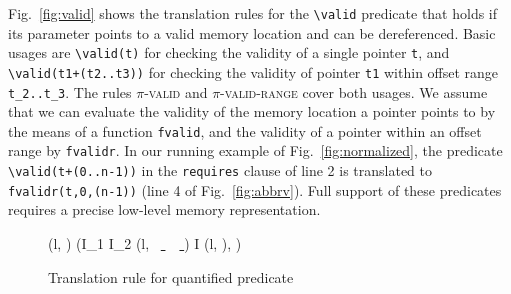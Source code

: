 Fig.~\ref{fig:valid} shows the translation rules for the \lstinline|\valid|
predicate that holds if its parameter points to a valid memory location and can
be dereferenced. 
Basic usages are
\lstinline{\valid(t)} 
for checking  the validity of a single 
pointer \lstinline{t},
and \lstinline|\valid(t1+(t2..t3))| for checking the validity of 
pointer \lstinline{t1} within offset range \lstinline|t_2..t_3|. The rules \textsc{$\pi$-valid} and
\textsc{$\pi$-valid-range} cover both usages. We assume that we can
evaluate the validity of the memory location a pointer points to by the means of
a function \lstinline|fvalid|, and the validity of a pointer 
within an offset range by \lstinline|fvalidr|.
In our running example of Fig.~\ref{fig:normalized}, the predicate
\lstinline|\valid(t+(0..n-1))| in the \lstinline|requires| clause of line 2 is
translated to \lstinline[style=c]|fvalidr(t,0,(n-1))| (line 4 of
Fig.~\ref{fig:abbrv}).
Full support of these predicates requires a precise low-level
memory representation. 



\begin{figure*}[bt]
\scriptsize{
  {
    {
      \splitfrac
          {(l, )
          }
          {
            (I_1 \concat I_2\concat
            (l,
            \underline{\Zinit {} \Zclear}
            \semicolon\
            \underline{ \Zclear}\
            \
            \underline{ \Zclear}
            \mathtt{)} \bopen)
            \concat I \concat (l,
            \mathtt{var_n = e;} \bclose),
            \mathtt{var_n})
          }
    }
  }
}
  \vspace{-2mm}
  \caption{Translation rule for quantified predicate}
  \label{fig:quantif}
\vspace{-4mm}
\end{figure*}


